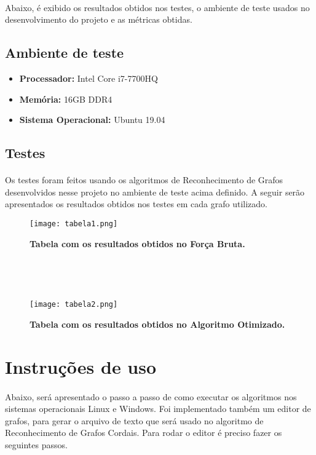 \documentclass[a4paper, 11pt]{article}
\begin{document}
			\paragraph{}Abaixo, é exibido os resultados obtidos nos testes, o ambiente de teste usados no desenvolvimento do projeto e as métricas  obtidas.
			\subsection{Ambiente de teste}
				\begin{itemize}
					\item \textbf{Processador:} Intel Core i7-7700HQ
					\item \textbf{Memória:} 16GB DDR4
					\item \textbf{Sistema Operacional:} Ubuntu 19.04
				\end{itemize}
			\subsection{Testes}
				\paragraph{}Os testes foram feitos usando os algoritmos de Reconhecimento de Grafos desenvolvidos nesse projeto no ambiente de teste acima definido. A seguir serão apresentados os resultados obtidos nos testes em cada grafo utilizado.
				
				\begin{figure}[H]
					\centering
					\texttt{[image: tabela1.png]}
					\caption{\textbf{Tabela com os resultados obtidos no Força Bruta.}}
					
					\ 
					
					\
					
					\texttt{[image: tabela2.png]}
					\centering
					\caption{\textbf{Tabela com os resultados obtidos no Algoritmo Otimizado.}}
				\end{figure}
				
				
		\section{Instruções de uso}
			\paragraph{}Abaixo, será apresentado o passo a passo de como executar os algoritmos nos sistemas operacionais Linux e Windows. Foi implementado também um editor de grafos, para gerar o arquivo de texto que será usado no algoritmo de Reconhecimento de Grafos Cordais. Para rodar o editor é preciso fazer os seguintes passos.
			
\end{document}
